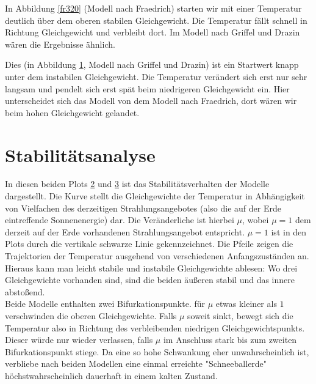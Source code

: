 \documentclass[]{report}
\begin{document}
In Abbildung \ref{fr320} (Modell nach Fraedrich) starten wir mit einer Temperatur deutlich über dem oberen stabilen Gleichgewicht. Die Temperatur fällt schnell in Richtung Gleichgewicht und verbleibt dort. Im Modell nach Griffel und Drazin wären die Ergebnisse ähnlich.

\begin{figure}[h!] \centering \def\svgwidth{\columnwidth} \caption{} \label{gd288}  \end{figure}

Dies (in Abbildung \ref{gd288}, Modell nach Griffel und Drazin) ist ein Startwert knapp unter dem instabilen Gleichgewicht. Die Temperatur verändert sich erst nur sehr langsam und pendelt sich erst spät beim niedrigeren Gleichgewicht ein. Hier unterscheidet sich das Modell von dem Modell nach Fraedrich, dort wären wir beim hohen Gleichgewicht gelandet.





\section{Stabilitätsanalyse}

\begin{figure}[h!] \centering \def\svgwidth{\columnwidth}  \caption{} \label{stabfr} \end{figure}
\begin{figure}[h!] \centering \def\svgwidth{\columnwidth}  \caption{} \label{stabgd} \end{figure}

In diesen beiden Plots \ref{stabfr} und \ref{stabgd} ist das Stabilitätsverhalten der Modelle dargestellt. Die Kurve stellt die Gleichgewichte der Temperatur in Abhängigkeit von Vielfachen des derzeitigen Strahlungsangebotes (also die auf der Erde eintreffende Sonnenenergie) dar. Die Veränderliche ist hierbei $\mu$, wobei $\mu = 1$ dem derzeit auf der Erde vorhandenen Strahlungsangebot entspricht. $\mu = 1$ ist in den Plots durch die vertikale schwarze Linie gekennzeichnet. Die Pfeile zeigen die Trajektorien der Temperatur ausgehend von verschiedenen Anfangszuständen an. Hieraus kann man leicht stabile und instabile Gleichgewichte ablesen: Wo drei Gleichgewichte vorhanden sind, sind die beiden äußeren stabil und das innere abstoßend.\\
Beide Modelle enthalten zwei Bifurkationspunkte. für $\mu$ etwas kleiner als $1$ verschwinden die oberen Gleichgewichte. Falls $\mu$ soweit sinkt, bewegt sich die Temperatur also in Richtung des verbleibenden niedrigen Gleichgewichtspunkts. Dieser würde nur wieder verlassen, falls $\mu$ im Anschluss stark bis zum zweiten Bifurkationspunkt stiege. Da eine so hohe Schwankung eher unwahrscheinlich ist, verbliebe nach beiden Modellen eine einmal erreichte "Schneeballerde" höchstwahrscheinlich dauerhaft in einem kalten Zustand.
\end{document}
